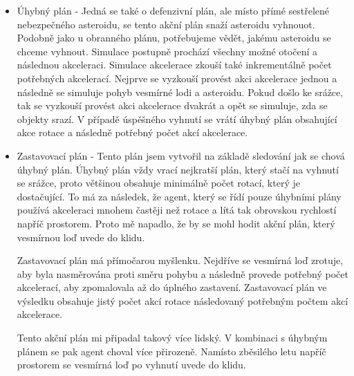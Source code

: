 \begin{itemize}
    \item Úhybný plán - Jedná se také o defenzivní plán, ale místo přímé sestřelené nebezpečného asteroidu, se tento akční plán snaží asteroidu vyhnouot.
    Podobně jako u obranného plánu, potřebujeme vědět, jakému asteroidu se chceme vyhnout. Simulace postupně prochází všechny možné otočení a následnou akceleraci.
    Simulace akcelerace zkouší také inkrementálně počet potřebných akcelerací. Nejprve se vyzkouší provést akci akcelerace jednou a následně se simuluje pohyb vesmírné lodi a asteroidu.
    Pokud došlo ke srážce, tak se vyzkouší provést akci akcelerace dvakrát a opět se simuluje, zda se objekty srazí. 
    V případě úspěšného vyhnutí se vrátí úhybný plán obsahující akce rotace a následně potřebný počet akcí akcelerace.
    
    \item Zastavovací plán - Tento plán jsem vytvořil na základě sledování jak se chová úhybný plán. Úhybný plán vždy vrací nejkratší plán, který stačí na vyhnutí se srážce, proto většinou obsahuje minimálně počet rotací, který je dostačující.
        To má za následek, že agent, který se řídí pouze úhybními plány používá akceleraci mnohem častěji než rotace a lítá tak obrovskou rychlostí napříč prostorem. Proto mě napadlo, že by se mohl hodit akční plán, který vesmírnou loď uvede do klidu.
        \par
        Zastavovací plán má přímočarou myšlenku. 
        Nejdříve se vesmírná loď zrotuje, aby byla nasměrována proti směru pohybu a následně provede potřebný počet akcelerací, aby zpomalovala až do úplného zastavení. 
        Zastavovací plán ve výsledku obsahuje jistý počet akcí rotace následovaný potřebným počtem akcí akcelerace. 

        \par
        Tento akční plán mi připadal takový více lidský. V kombinaci s úhybným plánem se pak agent choval více přirozeně.
        Namísto zběsilého letu napříč prostorem se vesmírná loď po vyhnutí uvede do klidu.            
        
\end{itemize}


